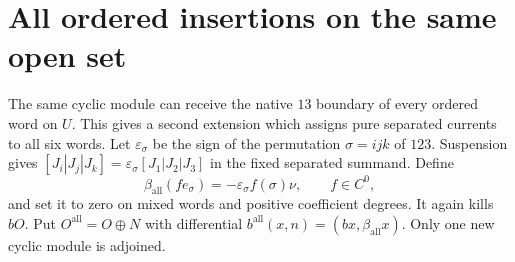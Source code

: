 \section{All ordered insertions on the same open set}

The same cyclic module can receive the native $13$ boundary of every ordered word on $U$.
This gives a second extension which assigns pure separated currents to all six words.
Let $\varepsilon_\sigma$ be the sign of the permutation $\sigma=ijk$ of $123$.
Suspension gives
$[J_i|J_j|J_k]=\varepsilon_\sigma[J_1|J_2|J_3]$ in the fixed separated summand.
Define
\[
 \beta_{\mathrm{all}}(fe_\sigma)=-\varepsilon_\sigma f(\sigma)\nu,
 \qquad f\in C^0,
\]
and set it to zero on mixed words and positive coefficient degrees.
It again kills $bO$.
Put $O^{\mathrm{all}}=O\oplus N$ with differential
$b^{\mathrm{all}}(x,n)=(bx,\beta_{\mathrm{all}}x)$.
Only one new cyclic module is adjoined.

